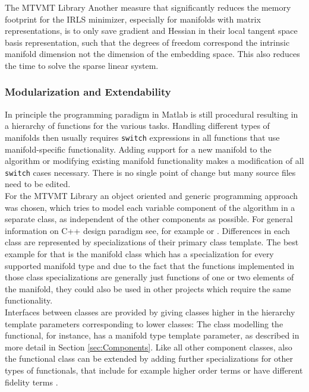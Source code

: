 \begin{chapter}{The MTVMT Library}
Another measure that significantly reduces the memory footprint for the IRLS minimizer, especially for manifolds with matrix representations, is to only save gradient and Hessian
in their local tangent space basis representation, such that the degrees of freedom correspond the intrinsic manifold dimension not the dimension of the embedding space. This also reduces
the time to solve the sparse linear system.\\

\subsubsection{Modularization and Extendability} %
\label{ssub:Modularization}
In principle the programming paradigm in Matlab is still procedural resulting in a hierarchy of functions for the various tasks. Handling different types of manifolds
then usually requires \texttt{switch} expressions in all functions that use manifold-specific functionality. Adding support for a new manifold to the algorithm or modifying
existing manifold functionality makes a modification of all \texttt{switch} cases necessary. There is no single point of change but many source files need to be edited.\\

For the MTVMT Library an object oriented and generic programming approach was chosen, which tries to model each variable component of the algorithm in a separate class, as 
independent of the other components as possible. For general information on C++ design paradigm see, for example \cite{CPPTemplateMP} or \cite{CPPGeneric}.
Differences in each class are represented by specializations of their primary class template. The best example for that is the
manifold class which has a specialization for every supported manifold type and due to the fact that the functions implemented in those class specializations are generally
just functions of one or two elements of the manifold, they could also be used in other projects which require the same functionality.\\

Interfaces between classes are provided by giving classes higher in the hierarchy template parameters corresponding to lower classes: The class modelling the functional, for instance,
has a manifold type template parameter, as described in more detail in Section \ref{sec:Components}. Like all other component classes, also the functional class can be extended
by adding further specializations for other types of functionals, that include for example higher order terms or have different fidelity terms \cite{SceneFlow}.\\


\end{chapter}
